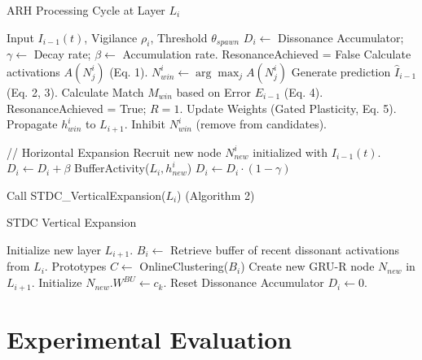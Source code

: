 \documentclass{article}
\begin{document}
\begin{algorithm}
\caption{ARH Processing Cycle at Layer $L_i$}\label{alg:arh_cycle}
\begin{algorithmic}[1]
\Require Input $I_{i-1}(t)$, Vigilance $\rho_i$, Threshold $\theta_{spawn}$
\State $D_i \gets$ Dissonance Accumulator; $\gamma \gets$ Decay rate; $\beta \gets$ Accumulation rate.
\State ResonanceAchieved = False
\State Calculate activations $A(N_j^i)$ (Eq. 1).
    \State $N_{win}^i \gets \arg\max_j A(N_j^i)$
    \State Generate prediction $\hat{I}_{i-1}$ (Eq. 2, 3).
    \State Calculate Match $M_{win}$ based on Error $E_{i-1}$ (Eq. 4).
        \State ResonanceAchieved = True; $R=1$.
        \State Update Weights (Gated Plasticity, Eq. 5).
        \State Propagate $h_{win}^i$ to $L_{i+1}$.
    \Else
        \State Inhibit $N_{win}^i$ (remove from candidates).
    \EndIf
\EndWhile

    \State // Horizontal Expansion
    \State Recruit new node $N_{new}^i$ initialized with $I_{i-1}(t)$.
    \State $D_i \gets D_i + \beta$ 
    \State BufferActivity($L_i, h_{new}^i$)
\Else
    \State $D_i \gets D_i \cdot (1-\gamma)$ 
\EndIf

    \State Call STDC\_VerticalExpansion($L_i$) (Algorithm 2)
\EndIf
\end{algorithmic}
\end{algorithm}

\begin{algorithm}
\caption{STDC Vertical Expansion}\label{alg:vertical_expansion}
\begin{algorithmic}[1]
    \State Initialize new layer $L_{i+1}$.
    \State $B_i \gets$ Retrieve buffer of recent dissonant activations from $L_i$.
    \State {}
    \State Prototypes $C \gets$ OnlineClustering($B_i$) 
        \State Create new GRU-R node $N_{new}$ in $L_{i+1}$.
        \State Initialize $N_{new}.W^{BU} \gets c_k$.
    \EndFor
    \State Reset Dissonance Accumulator $D_i \gets 0$.
\EndProcedure
\end{algorithmic}
\end{algorithm}

\section{Experimental Evaluation}
\end{document}
